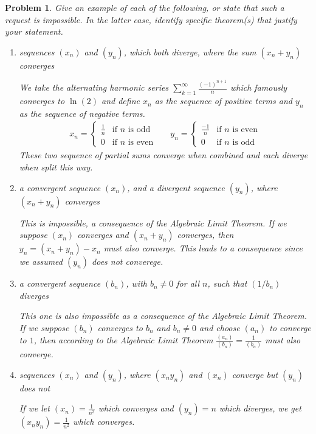 \documentclass[12pt]{article}
\newtheorem{problem}{Problem}
\begin{document}
\begin{problem} %
Give an example of each of the following, or state that such a request is impossible.  In the latter case, identify specific theorem(s) that justify your statement.

\renewcommand{\labelenumi}{(\alph{enumi})}
\begin{enumerate}
\item sequences $(x_n)$ and $(y_n)$, which both diverge, where the sum $(x_n+y_n)$ converges

	We take the alternating harmonic series $\sum_{k=1}^\infty \frac{(-1)^{n+1}}{n}$ which famously converges to $\ln(2)$ and define $x_n$ as the sequence of positive terms and $y_n$ as the sequence of negative terms.
	\begin{align*}
		x_n = 
	\begin{cases}
		\frac{1}{n} &\text{if } n \text{ is odd} \\
		0 & \text{if } n \text{ is even}
	\end{cases} && y_n =
	\begin{cases}
		\frac{-1}{n} &\text{if } n \text{ is even} \\
		0 & \text{if } n \text{ is odd}
	\end{cases}
\end{align*}
These two sequence of partial sums converge when combined and each diverge when split this way.
\item a convergent sequence $(x_n)$, and a divergent sequence $(y_n)$, where $(x_n+y_n)$ converges

This is impossible, a consequence of the Algebraic Limit Theorem. If we suppose $(x_n)$ converges and $(x_n + y_n)$ converges, then $y_n = (x_n + y_n) - x_n$ must also converge. This leads to a consequence since we assumed $(y_n)$ does not converege.
\item a convergent sequence $(b_n)$, with $b_n\ne 0$ for all $n$, such that $(1/b_n)$ diverges

	This one is also impossible as a consequence of the Algebraic Limit Theorem. If we suppose $(b_n)$ converges to $b_n$ and $b_n \neq 0$ and choose $(a_n)$ to converge to $1$, then according to the Algebraic Limit Theorem $\frac{(a_n)}{(b_n)} = \frac{1}{(b_n)}$ must also converge.

\item sequences $(x_n)$ and $(y_n)$, where $(x_n y_n)$ and $(x_n)$ converge but $(y_n)$ does not
	
	If we let $(x_n) = \frac{1}{n^3}$ which converges and $(y_n) = n$ which diverges, we get $(x_ny_n) = \frac{1}{n^2}$ which converges. 

\end{enumerate}
\end{problem}
\end{document}

